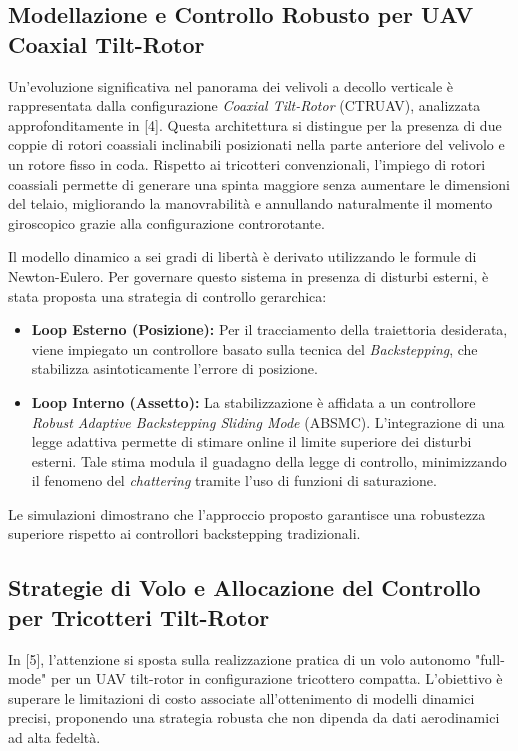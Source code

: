\documentclass[a4paper,12pt]{article}
\begin{document}
\subsection{Modellazione e Controllo Robusto per UAV Coaxial Tilt-Rotor}
Un'evoluzione significativa nel panorama dei velivoli a decollo verticale è rappresentata dalla configurazione \textit{Coaxial Tilt-Rotor} (CTRUAV), analizzata approfonditamente in [4]. Questa architettura si distingue per la presenza di due coppie di rotori coassiali inclinabili posizionati nella parte anteriore del velivolo e un rotore fisso in coda. Rispetto ai tricotteri convenzionali, l'impiego di rotori coassiali permette di generare una spinta maggiore senza aumentare le dimensioni del telaio, migliorando la manovrabilità e annullando naturalmente il momento giroscopico grazie alla configurazione controrotante.

Il modello dinamico a sei gradi di libertà è derivato utilizzando le formule di Newton-Eulero. Per governare questo sistema in presenza di disturbi esterni, è stata proposta una strategia di controllo gerarchica:
\begin{itemize}
    \item \textbf{Loop Esterno (Posizione):} Per il tracciamento della traiettoria desiderata, viene impiegato un controllore basato sulla tecnica del \textit{Backstepping}, che stabilizza asintoticamente l'errore di posizione.
    \item \textbf{Loop Interno (Assetto):} La stabilizzazione è affidata a un controllore \textit{Robust Adaptive Backstepping Sliding Mode} (ABSMC). L'integrazione di una legge adattiva permette di stimare online il limite superiore dei disturbi esterni. Tale stima modula il guadagno della legge di controllo, minimizzando il fenomeno del \textit{chattering} tramite l'uso di funzioni di saturazione.
\end{itemize}
Le simulazioni dimostrano che l'approccio proposto garantisce una robustezza superiore rispetto ai controllori backstepping tradizionali.

\subsection{Strategie di Volo e Allocazione del Controllo per Tricotteri Tilt-Rotor}
In [5], l'attenzione si sposta sulla realizzazione pratica di un volo autonomo "full-mode" per un UAV tilt-rotor in configurazione tricottero compatta. L'obiettivo è superare le limitazioni di costo associate all'ottenimento di modelli dinamici precisi, proponendo una strategia robusta che non dipenda da dati aerodinamici ad alta fedeltà.
\end{document}
